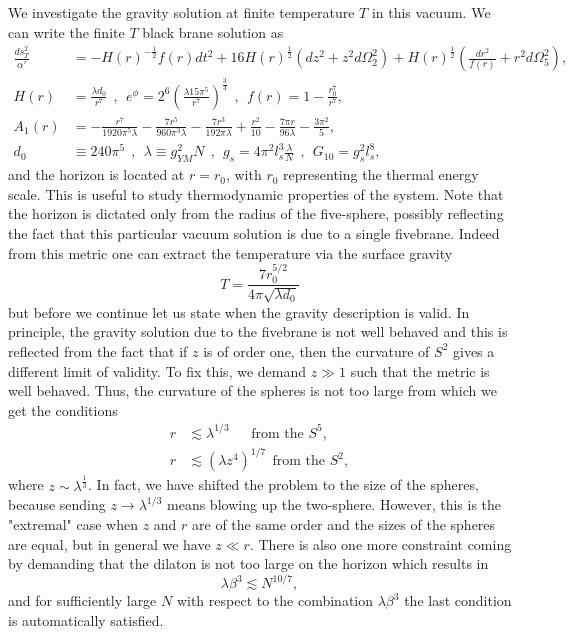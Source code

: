 \documentclass[11pt,english]{article}
\newcommand{\be}{\begin{equation}}
\newcommand{\ee}{\end{equation}}
\def\nn{\nonumber}
\numberwithin{equation}{section}
\begin{document}
 We investigate the gravity solution at finite temperature $T$ in this vacuum. We can write the finite $T$ black brane solution as 
\begin{align}\label{finiteT} \nn
\frac{ds^2_T}{\alpha'}&=-H(r)^{-\frac{1}{2}}f(r)dt^2+16H(r)^{\frac{1}{2}}\left(dz^2+z^2d\Omega_2^2\right)+H(r)^{\frac{1}{2}}\left(\frac{dr^2}{f(r)}+r^2d\Omega_5^2\right),\\
\nn H(r)&=\frac{\lambda d_0}{r^7}~~,~~ e^\phi =2^6\left(\frac{\lambda 15\pi^5}{r^7}\right)^\frac{3}{4}~~,~~f(r)=1-\frac{r_0^7}{r^7},\\
\nn A_1(r)&=-\frac{r^7}{1920\pi^5\lambda}-\frac{7r^5}{960\pi^3\lambda}-\frac{7r^3}{192\pi \lambda}+\frac{r^2}{10}-\frac{7\pi r}{96\lambda}-\frac{3\pi^2}{5},\\
d_0&\equiv 240\pi^5~~,~~\lambda\equiv g^2_{YM}N~~,~~g_s=4\pi^2l_s^3\frac{\lambda}{N}~~,~~G_{10}=g_s^2l_s^8,
\end{align}
and the horizon is located at $r=r_0$, with $r_0$ representing the thermal energy scale.  This is useful to study thermodynamic properties of the system. Note that the horizon is dictated only from the radius of the five-sphere, possibly reflecting the fact that this particular vacuum solution is due to a single fivebrane.  Indeed from this metric one can extract the temperature via the surface gravity 
\be 
T=\frac{7 r_0^{5/2}}{4\pi \sqrt{\lambda d_0}}
\ee 
but before we continue let us state when the gravity description is valid. In principle, the gravity solution due to the fivebrane is not well behaved and this is reflected from the fact that if $z$ is of order one, then the curvature of $S^2$ gives a different limit of validity. To fix this, we demand $z\gg 1$ \cite{Lin2006} such that the metric is well behaved. Thus, the curvature of the spheres is not too large from which we get the conditions 
\begin{align}
r&\lesssim \lambda^{1/3} ~~~~~~~\text{from the $S^5$},\\
r&\lesssim (\lambda z^4)^{1/7}~~\text{from the $S^2$},
\end{align}
where $z\sim\lambda^{\frac{1}{3}}$. In fact, we have shifted the problem to the size of the spheres, because sending $z\to \lambda^{1/3}$ means blowing up the two-sphere. However, this is the "extremal" case when $z$ and $r$ are of the same order and the sizes of the spheres are equal, but in general we have  $z\ll r$. There is also one more constraint coming by demanding that the dilaton is not too large on the horizon which results in 
\be 
\lambda \beta^3\lesssim N^{10/7},
\ee
and for sufficiently large $N$ with respect to the combination $\lambda\beta^3$ the last condition is automatically satisfied.
\end{document}
